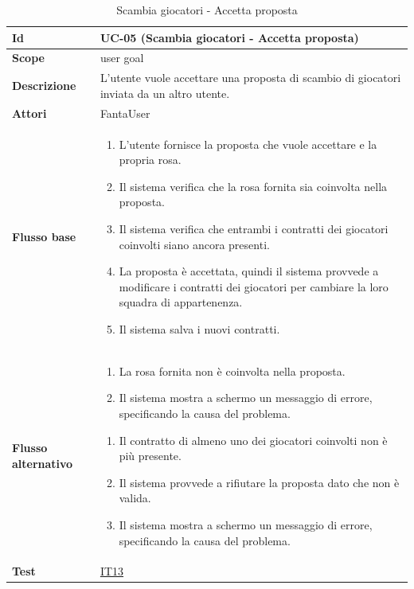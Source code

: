 \begin{table}[H]
\caption{Scambia giocatori - Accetta proposta}
\label{UC-05}

\begin{tabularx}{\textwidth}{|l|X|}
\hline
\textbf{Id} & UC-05 (Scambia giocatori - Accetta proposta) \\
\hline
\textbf{Scope} & user goal \\
\hline
\textbf{Descrizione} & L'utente vuole accettare una proposta di scambio di giocatori inviata da un altro utente. \\
\hline
\textbf{Attori} & FantaUser \\
\hline
\textbf{Flusso base} &
\begin{enumerate}[leftmargin=*]
    \item L'utente fornisce la proposta che vuole accettare e la propria rosa.
    \item Il sistema verifica che la rosa fornita sia coinvolta nella proposta.
    \item Il sistema verifica che entrambi i contratti dei giocatori coinvolti siano ancora presenti.
    \item La proposta è accettata, quindi il sistema provvede a modificare i contratti dei giocatori
            per cambiare la loro squadra di appartenenza.
    \item Il sistema salva i nuovi contratti. 
\end{enumerate} \\
\hline
\textbf{Flusso alternativo} &
\begin{enumerate}[leftmargin=*,label=2.\arabic*]
    \item La rosa fornita non è coinvolta nella proposta.
    \item Il sistema mostra a schermo un messaggio di errore, specificando la causa del problema.
\end{enumerate}
\begin{enumerate}[leftmargin=*,label=3.\arabic*]
    \item Il contratto di almeno uno dei giocatori coinvolti non è più presente.
    \item Il sistema provvede a rifiutare la proposta dato che non è valida.
    \item Il sistema mostra a schermo un messaggio di errore, specificando la causa del problema.
\end{enumerate} \\
\hline
\textbf{Test} & \hyperref[IT13]{IT13} \\
\hline
\end{tabularx}

\end{table}

